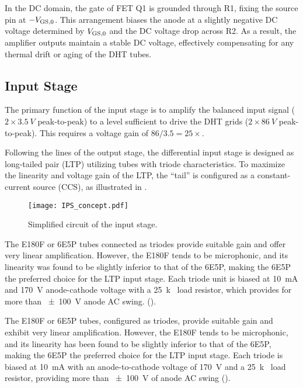 In the DC domain, the gate of FET Q1 is grounded through R1, fixing the source pin at $-V_{\rm GS,0}$. This arrangement biases the anode at a slightly negative DC voltage determined by $V_{\rm GS,0}$ and the DC voltage drop across R2. As a result, the amplifier outputs maintain a stable DC voltage, effectively compensating for any thermal drift or aging of the DHT tubes.


\subsection{Input Stage}

The primary function of the input stage is to amplify the balanced input signal ($2 \times \SI{3.5}{V}$ peak-to-peak) to a level sufficient to drive the DHT grids ($2 \times \SI{86}{V}$ peak-to-peak). This requires a voltage gain of $86 / 3.5 = 25\times$.

Following the lines of the output stage, the differential input stage is designed as long-tailed pair (LTP)\cite{valvewizard_LTP} utilizing tubes with triode characteristics. To maximize the linearity and voltage gain of the LTP, the ``tail'' is configured as a constant-current source (CCS), as illustrated in .

\begin{figure}
\begin{center}
\texttt{[image: IPS\_concept.pdf]}
\caption{Simplified circuit of the input stage.}
\end{center}
\end{figure}

The E180F or 6E5P tubes connected as triodes provide suitable gain and offer very linear amplification\cite{bartola_thdbenchmark,millett_pentodes,klausmobile_testerfiles}. However, the E180F tends to be microphonic\cite{osdeha_p23}, and its linearity was found to be slightly inferior to that of the 6E5P\cite{osdeha_p32}, making the 6E5P the preferred choice for the LTP input stage. Each triode unit is biased at \SI{10}{mA} and \SI{170}{V} anode-cathode voltage with a \SI{25}{k\Ohm} load resistor, which provides for more than \SI{\pm100}{V} anode AC swing. ().

The E180F or 6E5P tubes, configured as triodes, provide suitable gain and exhibit very linear amplification\cite{bartola_thdbenchmark,millett_pentodes,klausmobile_testerfiles}. However, the E180F tends to be microphonic\cite{osdeha_p23}, and its linearity has been found to be slightly inferior to that of the 6E5P\cite{osdeha_p32}, making the 6E5P the preferred choice for the LTP input stage. Each triode is biased at \SI{10}{mA} with an anode-to-cathode voltage of \SI{170}{V} and a \SI{25}{k\Ohm} load resistor, providing more than \SI{\pm100}{V} of anode AC swing ().

